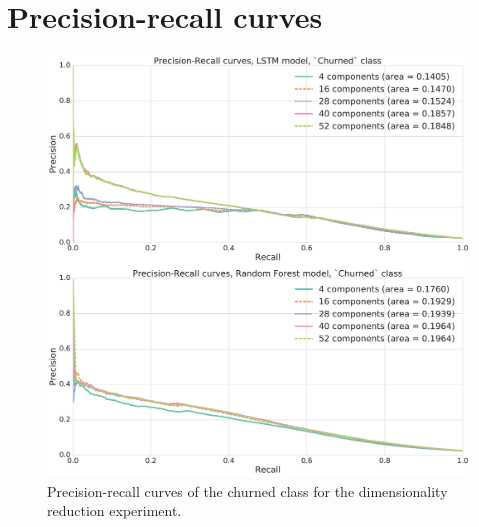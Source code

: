\documentclass{kththesis}
\begin{document}
\section{Precision-recall curves}

\begin{figure}[h]
    \centering
    \includegraphics[width=1.0\textwidth,keepaspectratio]{figures/prc_dim_reduction.pdf}
    \caption{Precision-recall curves of the churned class for the dimensionality reduction experiment.}
    \label{fig:prc_dim_reduction}
\end{figure}
\end{document}
